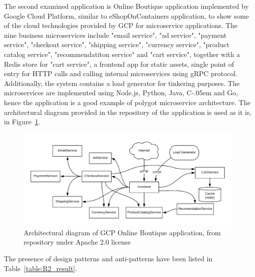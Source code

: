 \documentclass{Configuration_Files/PoliMi3i_thesis}
\newcommand{\Csharp}{%
  {\settoheight{\dimen0}{C}C\kern-.05em \resizebox{!}{\dimen0}{\raisebox{\depth}{\# }}}}
\begin{document}
The second examined application is Online Boutique application implemented by Google Cloud Platform, similar to eShopOnContainers application, to show some of the cloud technologies provided by GCP for microservice applications.
The nine business microservices include "email service", "ad service", "payment service", "checkout service", "shipping service", "currency service", "product catalog service", "recommendatiton service" and "cart service", together with a Redis store for "cart service", a frontend app for static assets, single point of entry for HTTP calls and calling internal microservices using gRPC protocol.
Additionally, the system contains a load generator for tinkering purposes.
The microservices are implemented using Node.js, Python, Java, \Csharp and Go, hence the application is a good example of polygot microservice architecture.
The architectural diagram provided in the repository of the application is used as it is, in Figure~\ref{fig:R2_arch}.

\begin{figure}[H]
\centering
\includegraphics[width=1\textwidth]{myImages/R2.png}
\caption{Architectural diagram of GCP Online Boutique application, from repository under Apache 2.0 license}
\label{fig:R2_arch}
\end{figure}

The presence of design patterns and anti-patterns have been listed in Table~\ref{table:R2_result}.
\end{document}
